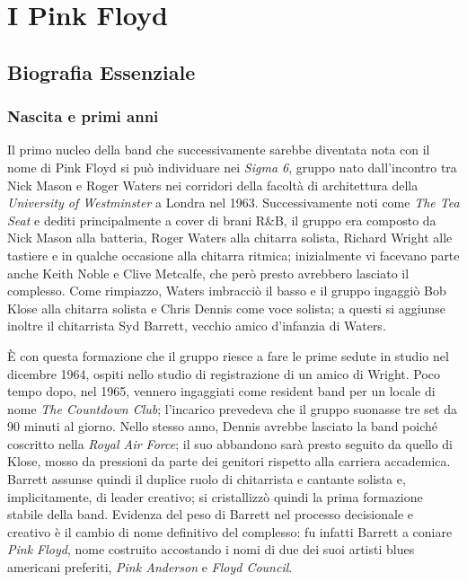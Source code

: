 \documentclass[class=book, crop=false, oneside, 12pt]{standalone}
\begin{document}
    \chapter{I Pink Floyd}

    \section{Biografia Essenziale}\label{sec:01-bio}
    \subsection{Nascita e primi anni}
    Il primo nucleo della band che successivamente sarebbe diventata nota con il nome di Pink Floyd si può individuare nei \emph{Sigma 6}, gruppo nato dall'incontro tra Nick Mason e Roger Waters nei corridori della facoltà di architettura della \emph{University of Westminster} a Londra nel 1963. Successivamente noti come \emph{The Tea Seat} e dediti principalmente a cover di brani R\&B, il gruppo era composto da Nick Mason alla batteria, Roger Waters alla chitarra solista, Richard Wright alle tastiere e in qualche occasione alla chitarra ritmica; inizialmente vi facevano parte anche Keith Noble e Clive Metcalfe, che però presto avrebbero lasciato il complesso. Come rimpiazzo, Waters imbracciò il basso e il gruppo ingaggiò Bob Klose alla chitarra solista e Chris Dennis come voce solista; a questi si aggiunse inoltre il chitarrista Syd Barrett, vecchio amico d'infanzia di Waters.

    È con questa formazione che il gruppo riesce a fare le prime sedute in studio nel dicembre 1964, ospiti nello studio di registrazione di un amico di Wright. Poco tempo dopo, nel 1965, vennero ingaggiati come resident band per un locale di nome \emph{The Countdown Club}; l'incarico prevedeva che il gruppo suonasse tre set da 90 minuti al giorno. Nello stesso anno, Dennis avrebbe lasciato la band poiché coscritto nella \emph{Royal Air Force}; il suo abbandono sarà presto seguito da quello di Klose, mosso da pressioni da parte dei genitori rispetto alla carriera accademica. Barrett assunse quindi il duplice ruolo di chitarrista e cantante solista e, implicitamente, di leader creativo; si cristallizzò  quindi la prima formazione stabile della band. Evidenza del peso di Barrett nel processo decisionale e creativo è il cambio di nome definitivo del complesso: fu infatti Barrett a coniare \emph{Pink Floyd}, nome costruito accostando i nomi di due dei suoi artisti blues americani preferiti, \emph{Pink Anderson} e \emph{Floyd Council}.
\end{document}
